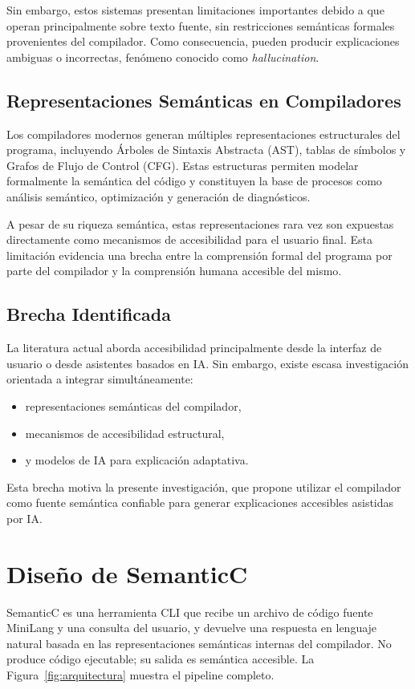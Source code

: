 \documentclass[conference]{IEEEtran}
\begin{document}
Sin embargo, estos sistemas presentan limitaciones importantes debido a que operan principalmente sobre texto fuente, sin restricciones semánticas formales provenientes del compilador. Como consecuencia, pueden producir explicaciones ambiguas o incorrectas, fenómeno conocido como \textit{hallucination}.

\subsection{Representaciones Semánticas en Compiladores}
Los compiladores modernos generan múltiples representaciones estructurales del programa, incluyendo Árboles de Sintaxis Abstracta (AST), tablas de símbolos y Grafos de Flujo de Control (CFG). Estas estructuras permiten modelar formalmente la semántica del código y constituyen la base de procesos como análisis semántico, optimización y generación de diagnósticos.

A pesar de su riqueza semántica, estas representaciones rara vez son expuestas directamente como mecanismos de accesibilidad para el usuario final. Esta limitación evidencia una brecha entre la comprensión formal del programa por parte del compilador y la comprensión humana accesible del mismo.

\subsection{Brecha Identificada}
La literatura actual aborda accesibilidad principalmente desde la interfaz de usuario o desde asistentes basados en IA. Sin embargo, existe escasa investigación orientada a integrar simultáneamente:
\begin{itemize}
    \item representaciones semánticas del compilador,
    \item mecanismos de accesibilidad estructural,
    \item y modelos de IA para explicación adaptativa.
\end{itemize}
Esta brecha motiva la presente investigación, que propone utilizar el compilador como fuente semántica confiable para generar explicaciones accesibles asistidas por IA.

\section{Diseño de SemanticC}
SemanticC es una herramienta CLI que recibe un archivo de código fuente MiniLang y una consulta del usuario, y devuelve una respuesta en lenguaje natural basada en las representaciones semánticas internas del compilador. No produce código ejecutable; su salida es semántica accesible. La Figura~\ref{fig:arquitectura} muestra el pipeline completo.
\end{document}
